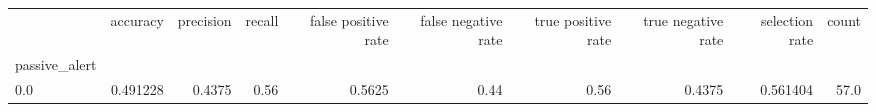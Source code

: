 \begin{tabular}{lrrrrrrrrr}
\toprule
{} &  accuracy &  precision &  recall &  false positive rate &  false negative rate &  true positive rate &  true negative rate &  selection rate &  count \\
passive\_alert &           &            &         &                      &                      &                     &                     &                 &        \\
\midrule
0.0           &  0.491228 &     0.4375 &    0.56 &               0.5625 &                 0.44 &                0.56 &              0.4375 &        0.561404 &   57.0 \\
\bottomrule
\end{tabular}
